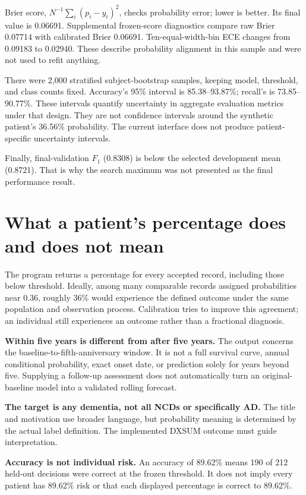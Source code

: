Brier score, $N^{-1}\sum_i(p_i-y_i)^2$, checks probability error; lower is better. Its final value is 0.06691. Supplemental frozen-score diagnostics compare raw Brier 0.07714 with calibrated Brier 0.06691. Ten-equal-width-bin ECE changes from 0.09183 to 0.02940. These describe probability alignment in this sample and were not used to refit anything.

There were 2,000 stratified subject-bootstrap samples, keeping model, threshold, and class counts fixed. Accuracy's 95\% interval is 85.38--93.87\%; recall's is 73.85--90.77\%. These intervals quantify uncertainty in aggregate evaluation metrics under that design. They are not confidence intervals around the synthetic patient's 36.56\% probability. The current interface does not produce patient-specific uncertainty intervals.

Finally, final-validation $F_1$ (0.8308) is below the selected development mean (0.8721). That is why the search maximum was not presented as the final performance result.
\clearpage

\section{What a patient's percentage does and does not mean}
The program returns a percentage for every accepted record, including those below threshold. Ideally, among many comparable records assigned probabilities near 0.36, roughly 36\% would experience the defined outcome under the same population and observation process. Calibration tries to improve this agreement; an individual still experiences an outcome rather than a fractional diagnosis.

\textbf{Within five years is different from after five years.} The output concerns the baseline-to-fifth-anniversary window. It is not a full survival curve, annual conditional probability, exact onset date, or prediction solely for years beyond five. Supplying a follow-up assessment does not automatically turn an original-baseline model into a validated rolling forecast.

\textbf{The target is any dementia, not all NCDs or specifically AD.} The title and motivation use broader language, but probability meaning is determined by the actual label definition. The implemented DXSUM outcome must guide interpretation.

\textbf{Accuracy is not individual risk.} An accuracy of 89.62\% means 190 of 212 held-out decisions were correct at the frozen threshold. It does not imply every patient has 89.62\% risk or that each displayed percentage is correct to 89.62\%.

